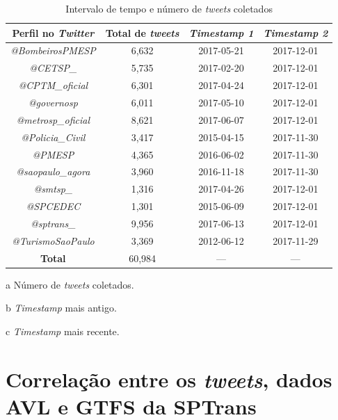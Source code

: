 \documentclass[
	12pt,				%
	oneside,			%
	a4paper,			%
	english,			%
	brazil				%
	]{abntex2ppgsi}
\begin{document}
{{{\begin{table}[!htb]
\centering
\caption{Intervalo de tempo e número de \textit{tweets} coletados}
	\label{tab:tweetsCollected}
\begin{threeparttable}
\begin{tabular}{c|c|c|c}
\toprule
\textbf {Perfil no \textit{Twitter}} &\textbf{Total de \textit{tweets}\tnote{a}}  &\textbf{ \textit{Timestamp 1\tnote{b}}} & \textbf{\textit{Timestamp 2\tnote{c}}} \\ 
\midrule
\textit{@BombeirosPMESP} & 6,632 & 2017-05-21 & 2017-12-01 \\
\hline
\textit{@CETSP\_} & 5,735 & 2017-02-20  & 2017-12-01 \\
\hline
\textit{@CPTM\_oficial} & 6,301 & 2017-04-24 & 2017-12-01 \\
\hline
\textit{@governosp}  & 6,011 & 2017-05-10 & 2017-12-01 \\
\hline
\textit{@metrosp\_oficial} & 8,621 & 2017-06-07 & 2017-12-01 \\
\hline
\textit{@Policia\_Civil}  & 3,417 & 2015-04-15 & 2017-11-30 \\
\hline
\textit{@PMESP}  & 4,365 & 2016-06-02 & 2017-11-30 \\
\hline
\textit{@saopaulo\_agora}  & 3,960 & 2016-11-18 & 2017-11-30 \\
\hline
\textit{@smtsp\_} & 1,316 & 2017-04-26 & 2017-12-01 \\
\hline
\textit{@SPCEDEC} & 1,301 & 2015-06-09 & 2017-12-01 \\
\hline
\textit{@sptrans\_} & 9,956 & 2017-06-13 & 2017-12-01 \\
\hline
\textit{@TurismoSaoPaulo} & 3,369 & 2012-06-12 & 2017-11-29 \\
\midrule
\midrule
\textbf{Total} & 60,984 & --- & --- \\
\bottomrule
\end{tabular}
\begin{tablenotes}
            \item[a] Número de \textit{tweets} coletados.
            \item[b] \textit{Timestamp} mais antigo.
            \item[c] \textit{Timestamp} mais recente.
        \end{tablenotes}
\end{threeparttable}
\end{table}

\clearpage

\section{Correlação entre os \textit{tweets}, dados AVL e GTFS da SPTrans}
\label{corrAll}

}}}
\end{document}
